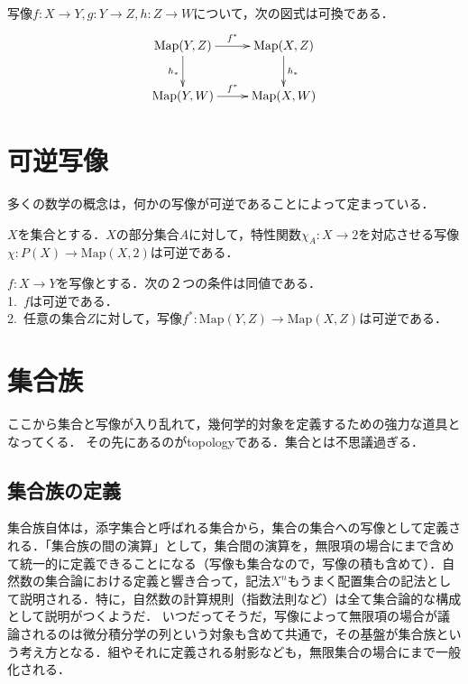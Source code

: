 \documentclass[uplatex, 12pt, dvipdfmx]{jsreport}
\begin{document}
\begin{proposition}[associativity]
    写像$f:X\to Y,g:Y\to Z,h:Z\to W$について，次の図式は可換である．
    \[\xymatrix{
        \Map(Y,Z)\ar[r]^-{f^*}\ar[d]_-{h_*}&\Map(X,Z)\ar[d]^-{h_*}\\
        \Map(Y,W)\ar[r]^-{f^*}&\Map(X,W)
    }\]
\end{proposition}

\section{可逆写像}

\begin{screen}
    多くの数学の概念は，何かの写像が可逆であることによって定まっている．
\end{screen}

\begin{proposition}[部分集合と特性関数]
	$X$を集合とする．$X$の部分集合$A$に対して，特性関数$\chi_A:X\to 2$を対応させる写像$\chi :P(X)\to \mathrm{Map}(X,2)$は可逆である．
\end{proposition}

\begin{proposition}$f:X\to Y$を写像とする．次の２つの条件は同値である．\rm{}\\
    1.\, $f$は可逆である．\\
    2.\, 任意の集合$Z$に対して，写像$f^*:\mathrm{Map}(Y,Z)\to\mathrm{Map}(X,Z)$は可逆である．
\end{proposition}

\section{集合族}
ここから集合と写像が入り乱れて，幾何学的対象を定義するための強力な道具となってくる．
その先にあるのがtopologyである．集合とは不思議過ぎる．

\subsection*{集合族の定義}
集合族自体は，添字集合と呼ばれる集合から，集合の集合への写像として定義される．「集合族の間の演算」として，集合間の演算を，無限項の場合にまで含めて統一的に定義できることになる（写像も集合なので，写像の積も含めて）．自然数の集合論における定義と響き合って，記法$X^n$もうまく配置集合の記法として説明される．特に，自然数の計算規則（指数法則など）は全て集合論的な構成として説明がつくようだ．
いつだってそうだ，写像によって無限項の場合が議論されるのは微分積分学の列という対象も含めて共通で，その基盤が集合族という考え方となる．組やそれに定義される射影なども，無限集合の場合にまで一般化される．
\end{document}
